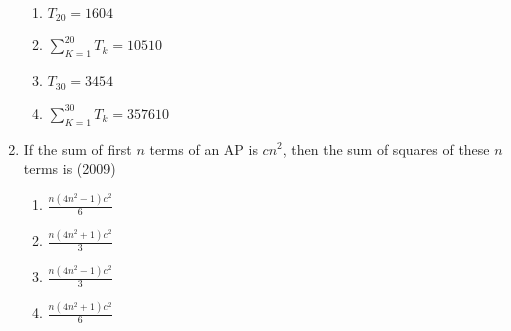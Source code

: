 \begin{enumerate}[label=\thesubsection.\arabic*,ref=\thesubsection.\theenumi]
	\hfill {}
		\begin{multicols}{2}
\begin{enumerate}
\item     $T_{20} =1604$  
\item    $\sum_{K=1}^{20}T_k=10510$
\item     $T_{30}=3454$ 
\item     $\sum_{K=1}^{30}T_k=357610$  
\end{enumerate}
                                         \end{multicols} 
\item If the sum of first $n$ terms of an AP is $cn^2$,  then the sum of squares of these $n$ terms is \hfill(2009)
%                
%            
             \begin{multicols}{4}
\begin{enumerate}    
                    \item $\frac{n(4n^2-1)c^2}{6}$
                    \item $\frac{n(4n^2+1)c^2}{3}$
                    \item $\frac{n(4n^2-1)c^2}{3}$
                    \item $\frac{n(4n^2+1)c^2}{6}$
		\end{enumerate}
         \end{multicols}
%  
\end{enumerate}
